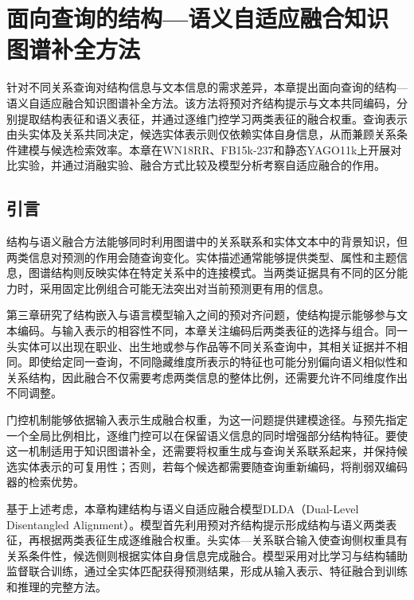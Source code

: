 \chapter{面向查询的结构—语义自适应融合知识图谱补全方法}
\label{chap:adaptive}

针对不同关系查询对结构信息与文本信息的需求差异，本章提出面向查询的结构—语义自适应融合知识图谱补全方法。该方法将预对齐结构提示与文本共同编码，分别提取结构表征和语义表征，并通过逐维门控学习两类表征的融合权重。查询表示由头实体及关系共同决定，候选实体表示则仅依赖实体自身信息，从而兼顾关系条件建模与候选检索效率。本章在WN18RR、FB15k-237和静态YAGO11k上开展对比实验，并通过消融实验、融合方式比较及模型分析考察自适应融合的作用。

\section{引言}

结构与语义融合方法能够同时利用图谱中的关系联系和实体文本中的背景知识，但两类信息对预测的作用会随查询变化。实体描述通常能够提供类型、属性和主题信息，图谱结构则反映实体在特定关系中的连接模式。当两类证据具有不同的区分能力时，采用固定比例组合可能无法突出对当前预测更有用的信息。

第三章研究了结构嵌入与语言模型输入之间的预对齐问题，使结构提示能够参与文本编码。与输入表示的相容性不同，本章关注编码后两类表征的选择与组合。同一头实体可以出现在职业、出生地或参与作品等不同关系查询中，其相关证据并不相同。即使给定同一查询，不同隐藏维度所表示的特征也可能分别偏向语义相似性和关系结构，因此融合不仅需要考虑两类信息的整体比例，还需要允许不同维度作出不同调整。

门控机制能够依据输入表示生成融合权重，为这一问题提供建模途径\cite{srivastava2015highway,arevalo2017gated}。与预先指定一个全局比例相比，逐维门控可以在保留语义信息的同时增强部分结构特征。要使这一机制适用于知识图谱补全，还需要将权重生成与查询关系联系起来，并保持候选实体表示的可复用性；否则，若每个候选都需要随查询重新编码，将削弱双编码器的检索优势。

基于上述考虑，本章构建结构与语义自适应融合模型DLDA（Dual-Level Disentangled Alignment）。模型首先利用预对齐结构提示形成结构与语义两类表征，再根据两类表征生成逐维融合权重。头实体—关系联合输入使查询侧权重具有关系条件性，候选侧则根据实体自身信息完成融合。模型采用对比学习与结构辅助监督联合训练，通过全实体匹配获得预测结果，形成从输入表示、特征融合到训练和推理的完整方法。

